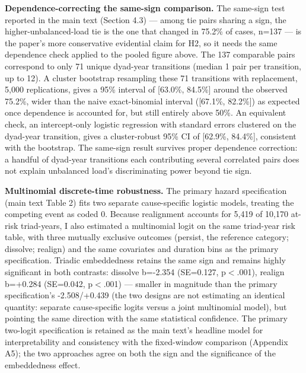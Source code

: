 \documentclass[Afour,sageh,times,doublespace]{sagej}
\begin{document}
\textbf{Dependence-correcting the same-sign comparison.} The same-sign test reported in the main text (Section 4.3) --- among tie pairs sharing a sign, the higher-unbalanced-load tie is the one that changed in 75.2\% of cases, n=137 --- is the paper's more conservative evidential claim for H2, so it needs the same dependence check applied to the pooled figure above. The 137 comparable pairs correspond to only 71 unique dyad-year transitions (median 1 pair per transition, up to 12). A cluster bootstrap resampling these 71 transitions with replacement, 5,000 replications, gives a 95\% interval of [63.0\%, 84.5\%] around the observed 75.2\%, wider than the naive exact-binomial interval ([67.1\%, 82.2\%]) as expected once dependence is accounted for, but still entirely above 50\%. An equivalent check, an intercept-only logistic regression with standard errors clustered on the dyad-year transition, gives a cluster-robust 95\% CI of [62.9\%, 84.4\%], consistent with the bootstrap. The same-sign result survives proper dependence correction: a handful of dyad-year transitions each contributing several correlated pairs does not explain unbalanced load's discriminating power beyond tie sign.

\textbf{Multinomial discrete-time robustness.} The primary hazard specification (main text Table 2) fits two separate cause-specific logistic models, treating the competing event as coded 0. Because realignment accounts for 5,419 of 10,170 at-risk triad-years, I also estimated a multinomial logit on the same triad-year risk table, with three mutually exclusive outcomes (persist, the reference category; dissolve; realign) and the same covariates and duration bins as the primary specification. Triadic embeddedness retains the same sign and remains highly significant in both contrasts: dissolve b=-2.354 (SE=0.127, p$<$.001), realign b=+0.284 (SE=0.042, p$<$.001) --- smaller in magnitude than the primary specification's -2.508/+0.439 (the two designs are not estimating an identical quantity: separate cause-specific logits versus a joint multinomial model), but pointing the same direction with the same statistical confidence. The primary two-logit specification is retained as the main text's headline model for interpretability and consistency with the fixed-window comparison (Appendix A5); the two approaches agree on both the sign and the significance of the embeddedness effect.
\end{document}
